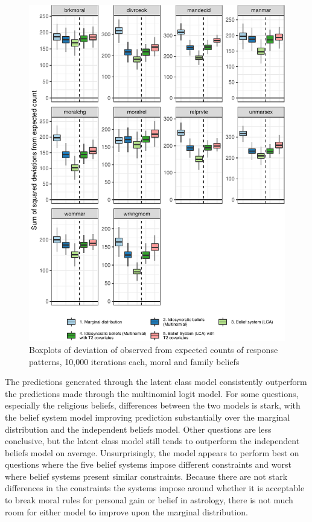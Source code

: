 \documentclass[12pt,]{article}
\begin{document}
\begin{figure}

{\centering \includegraphics{rethinking_constraint_revision_files/figure-latex/predictionerrornotrel-1} 

}

\caption{Boxplots of deviation of observed from expected counts of response patterns, 10,000 iterations each, moral and family beliefs}\label{fig:predictionerrornotrel}
\end{figure}

The predictions generated through the latent class model consistently outperform the predictions made through the multinomial logit model. For some questions, especially the religious beliefs, differences between the two models is stark, with the belief system model improving prediction substantially over the marginal distribution and the independent beliefs model. Other questions are less conclusive, but the latent class model still tends to outperform the independent beliefs model on average. Unsurprisingly, the model appears to perform best on questions where the five belief systems impose different constraints and worst where belief systems present similar constraints. Because there are not stark differences in the constraints the systems impose around whether it is acceptable to break moral rules for personal gain or belief in astrology, there is not much room for either model to improve upon the marginal distribution.
\end{document}
